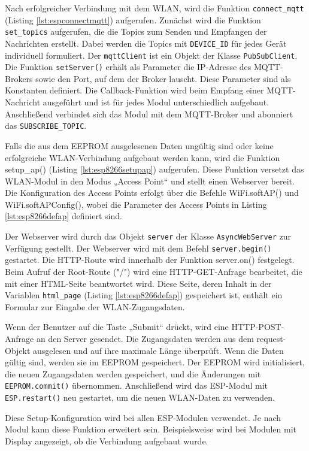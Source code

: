 \documentclass[12pt, letterpaper]{article}
\begin{document}
  \par Nach erfolgreicher Verbindung mit dem WLAN, wird die Funktion \texttt{connect\_mqtt} (Listing \ref{lst:espconnectmqtt}) aufgerufen. Zunächst wird die Funktion \texttt{set\_topics} aufgerufen, die die Topics zum Senden und Empfangen der Nachrichten erstellt. Dabei werden die Topics mit \texttt{DEVICE\_ID} für jedes Gerät individuell formuliert. Der \texttt{mqttClient} ist ein Objekt der Klasse \texttt{PubSubClient}. Die Funktion \texttt{setServer()} erhält als Parameter die IP-Adresse des MQTT-Brokers sowie den Port, auf dem der Broker lauscht. Diese Parameter sind als Konstanten definiert. Die Callback-Funktion wird beim Empfang einer MQTT-Nachricht ausgeführt und ist für jedes Modul unterschiedlich aufgebaut. Anschließend verbindet sich das Modul mit dem MQTT-Broker und abonniert das \texttt{SUBSCRIBE\_TOPIC}.
  \par Falls die aus dem EEPROM ausgelesenen Daten ungültig sind oder keine erfolgreiche WLAN-Verbindung aufgebaut werden kann, wird die Funktion setup\_ap() (Listing \ref{lst:esp8266setupap}) aufgerufen. Diese Funktion versetzt das WLAN-Modul in den Modus „Access Point“ und stellt einen Webserver bereit. Die Konfiguration des Access Points erfolgt über die Befehle WiFi.softAP() und WiFi.softAPConfig(), wobei die Parameter des Access Points in Listing \ref{lst:esp8266defap} definiert sind. 
  \par Der Webserver wird durch das Objekt \texttt{server} der Klasse \texttt{AsyncWebServer} zur Verfügung gestellt. Der Webserver wird mit dem Befehl \texttt{server.begin()} gestartet. Die HTTP-Route wird innerhalb der Funktion server.on() festgelegt. Beim Aufruf der Root-Route ("/") wird eine HTTP-GET-Anfrage bearbeitet, die mit einer HTML-Seite beantwortet wird. Diese Seite, deren Inhalt in der Variablen \texttt{html\_page} (Listing \ref{lst:esp8266defap}) gespeichert ist, enthält ein Formular zur Eingabe der WLAN-Zugangsdaten.
  \par Wenn der Benutzer auf die Taste „Submit“ drückt, wird eine HTTP-POST-Anfrage an den Server gesendet. Die Zugangsdaten werden aus dem request-Objekt ausgelesen und auf ihre maximale Länge überprüft. Wenn die Daten gültig sind, werden sie im EEPROM gespeichert. Der EEPROM wird initialisiert, die neuen Zugangsdaten werden gespeichert, und die Änderungen mit \texttt{EEPROM.commit()} übernommen. Anschließend wird das ESP-Modul mit \texttt{ESP.restart()} neu gestartet, um die neuen WLAN-Daten zu verwenden.
  \par Diese Setup-Konfiguration wird bei allen ESP-Modulen verwendet. Je nach Modul kann diese Funktion erweitert sein. Beispielsweise wird bei Modulen mit Display angezeigt, ob die Verbindung aufgebaut wurde.
\end{document}
